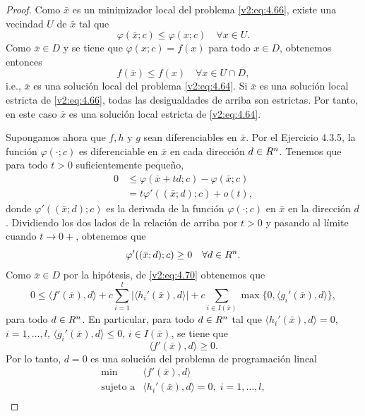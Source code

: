 \begin{proof}
    Como $\bar{x}$ es un minimizador local del problema \eqref{v2:eq:4.66}, existe una vecindad $U$ de $\bar{x}$ tal que
    \[
        \varphi(\bar{x}; c) \le \varphi(x; c) \quad \forall x \in U.
    \]
    Como $\bar{x} \in D$ y se tiene que $\varphi(x; c) = f(x)$ para todo $x \in D$, obtenemos entonces
    \[
        f(\bar{x}) \le f(x) \quad \forall x \in U \cap D,
    \]
    i.e., $\bar{x}$ es una solución local del problema \eqref{v2:eq:4.64}. Si $\bar{x}$ es una solución local estricta de \eqref{v2:eq:4.66}, todas las desigualdades de arriba son estrictas. Por tanto, en este caso $\bar{x}$ es una solución local estricta de \eqref{v2:eq:4.64}.

    Supongamos ahora que $f, h$ y $g$ sean diferenciables en $\bar{x}$. Por el Ejercicio 4.3.5, la función $\varphi(\cdot; c)$ es diferenciable en $\bar{x}$ en cada dirección $d \in R^n$. Tenemos que para todo $t > 0$ suficientemente pequeño,
    \begin{align*}
        0 &\le \varphi(\bar{x} + td; c) - \varphi(\bar{x}; c) \\
        &= t\varphi'((\bar{x}; d); c) + o(t),
    \end{align*}
    donde $\varphi'((\bar{x}; d); c)$ es la derivada de la función $\varphi(\cdot; c)$ en $\bar{x}$ en la dirección $d$. Dividiendo los dos lados de la relación de arriba por $t > 0$ y pasando al límite cuando $t \to 0+$, obtenemos que
    \[
        \varphi'((\bar{x}; d); c) \ge 0 \quad \forall d \in R^n.
    \]
    Como $\bar{x} \in D$ por la hipótesis, de \eqref{v2:eq:4.70} obtenemos que
    \begin{equation}
        0 \le \langle f'(\bar{x}), d \rangle + c \sum_{i=1}^l |\langle h_i'(\bar{x}), d \rangle| + c \sum_{i \in I(\bar{x})} \max\{0, \langle g_i'(\bar{x}), d \rangle\},
        \label{v2:eq:4.71}
    \end{equation}
    para todo $d \in R^n$. En particular, para todo $d \in R^n$ tal que $\langle h_i'(\bar{x}), d \rangle = 0$, $i = 1, \dots, l$, $\langle g_i'(\bar{x}), d \rangle \le 0$, $i \in I(\bar{x})$, se tiene que
    \[
        \langle f'(\bar{x}), d \rangle \ge 0.
    \]
    Por lo tanto, $d = 0$ es una solución del problema de programación lineal
    \begin{equation}
        \begin{array}{rl}
            \min & \langle f'(\bar{x}), d \rangle \\
            \text{sujeto a} & \langle h_i'(\bar{x}), d \rangle = 0, \; i = 1, \dots, l, \\

\end{array}
\end{equation}
\end{proof}
